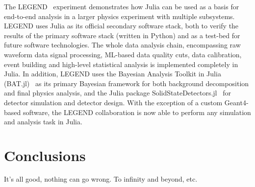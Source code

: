 \documentclass{webofc}
\begin{document}
The LEGEND~\cite{LEGEND:2017AIPC} experiment demonstrates how Julia can be used
as a basis for end-to-end analysis in a larger physics experiment with multiple
subsystems. LEGEND uses Julia as its official secondary software stack, both to
verify the results of the primary software stack (written in Python) and as a
test-bed for future software technologies. The whole data analysis chain,
encompassing raw waveform data signal processing, ML-based data quality cuts,
data calibration, event building and high-level statistical analysis is
implemented completely in Julia. In addition, LEGEND uses the Bayesian Analysis
Toolkit in Julia (BAT.jl)~\cite{Schulz:2021BAT} as its primary Bayesian
framework for both background decomposition and final physics analysis, and the
Julia package SolidStateDetectors.jl~\cite{Abt:2021SSD} for detector simulation
and detector design. With the exception of a custom Geant4-based software, the
LEGEND collaboration is now able to perform any simulation and analysis task in
Julia.


\section{Conclusions}

It's all good, nothing can go wrong. To infinity and beyond, etc.

\sloppy
\raggedright

\end{document}
